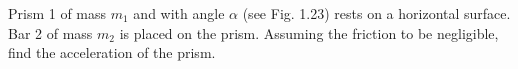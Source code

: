\item Prism 1 of mass \(m_1\) and with angle \(\alpha\) (see Fig. 1.23) rests on a horizontal surface. Bar 2 of mass \(m_2\) is placed on the prism. Assuming the friction to be negligible, find the acceleration of the prism. 
    \begin{center}
    \end{center}